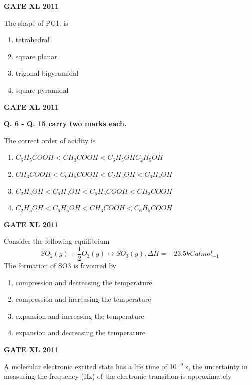 \documentclass[journal,12pt,onecolumn]{IEEEtran}
\begin{document}
\begin{enumerate}
{\begin{enumerate}
		\end{enumerate}\hfill{\textbf{GATE XL 2011}}

	\item{ The shape of PC1, is}
		\begin{enumerate}
			\item{ tetrahedral }
			\item{square planar }
			\item{trigonal bipyramidal}
			\item{square pyramidal}

		\end{enumerate}\hfill{\textbf{GATE XL 2011}}

	\textbf{Q. 6 - Q. 15 carry two marks each.}

	\item{ The correct order of acidity is}
		\begin{enumerate}
			\item{ $C_6H_5COOH < CH_3COOH < C_6H_5OH C_2H_5OH$}
		\item{$CH_3COOH < C_6H_5COOH < C_2H_5OH < C_6H_5OH$}
			\item{$C_2H_5OH < C_6H_5OH < C_6H_5COOH < CH_3COOH$}
			\item{$C_2H_5OH < C_6H_5OH< CH_3COOH < C_6H_5COOH$}

		\end{enumerate}\hfill{\textbf{GATE XL 2011}}

	\item{ Consider the following equilibrium \[ SO_2 (g) + \frac{1}{2} O_2 (g)\leftrightarrow SO_3 (g), \Delta H =-23.5 kCal mol_{-1} \]
		The formation of SO3 is favoured by}
		
		\begin{enumerate}
	\item{ compression and decreasing the temperature}

	\item{ compression and increasing the temperature}

	\item{ expansion and increasing the temperature }
	\item{ expansion and decreasing the temperature}
		\end{enumerate}\hfill{\textbf{GATE XL 2011}}

	\item {A molecular electronic excited state has a life time of 10$^{-9}$ s, the uncertainty in measuring the frequency (Hz) of the electronic transition is approximately}


}
\end{enumerate}
\end{document}
